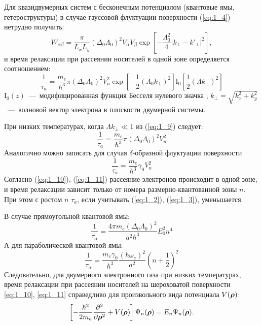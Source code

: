Для квазидвумерных систем с бесконечным потенциалом (квантовые ямы, гетероструктуры) в случае гауссовой флуктуации поверхности (\ref{eq:1_4}) нетрудно получить:
\begin{equation} \label{eq:1_9_0}
W_{\alpha\beta} =\frac{\pi }{L_x L_y} (\Delta_0 \Lambda_0 )^2 V_{\alpha} V_{\beta } \exp \left[-\frac{\Lambda_0^2 }{4} \left|k_{\bot } -k'_{\bot } \right|^2 \right],
\end{equation}
и время релаксации при рассеянии носителей в одной зоне определяется соотношением:
\begin{equation} \label{eq:1_9}
\frac{1}{\tau_a}=\frac{m_e}{\hbar^3}\pi{(\Delta_0 \Lambda_0)}^2 V_n^2 \exp{\left[-\frac{1}{2}(\Lambda_0 k_\bot )^2\right]} \mathrm{I}_0 \left[\frac{1}{2}(\Lambda k_\bot)^2\right]
\end{equation}
$\mathrm{I}_0(z)$~---~модифицированная функция Бесселя нулевого значка \cite{Abramowitz1979}, $k_\bot = \sqrt{k^2_x+k^2_y}$~---~волновой вектор электрона в плоскости двумерной системы.

При низких температурах, когда $\Lambda k_\bot \ll 1$ из (\ref{eq:1_9}) следует:
\begin{equation} \label{eq:1_10}
\frac{1}{\tau_a}=\frac{m_e }{\hbar^3}\pi (\Delta_0 \Lambda_0)^2 V_n^2
\end{equation}
Аналогично можно записать для случая $\delta$-образной флуктуации поверхности
\begin{equation} \label{eq:1_11}
\frac{1}{\tau_a}=\frac{m_e}{\hbar^3}\gamma_0 V_n^2
\end{equation}
Согласно (\ref{eq:1_10}), (\ref{eq:1_11}) рассеяние электронов происходит в одной зоне, и время релаксации зависит только от номера размерно-квантованной зоны $n$. При этом с ростом $n$ $\tau_a$, если учитывать (\ref{eq:1_2}), (\ref{eq:1_3}), уменьшается.

В случае прямоугольной квантовой ямы:
\begin{equation}
\frac{1}{\tau_\alpha} = \frac{4\pi m_e (\Delta_0 \Lambda_0)^2 }{a^2 \hbar^3} E_0^2 n^4 
\end{equation}
А для параболической квантовой ямы:
\begin{equation} \label{eq:1_14}
\frac{1}{\tau_\alpha} = \frac{m_e \gamma_0}{\hbar^3} \frac{(\hbar\omega_e)^2}{a^2}{\left(n + \frac{1}{2}\right)}^2
\end{equation}
Следовательно, для двумерного электронного газа при низких температурах, время релаксации при рассеянии носителей на шероховатой поверхности \eqref{eq:1_10}, \eqref{eq:1_11} справедливо для произвольного вида потенциала $V(\boldsymbol{\mathbf{\rho}})$:
\[
\left[-\frac{\hbar^2}{2m_e}\frac{\partial^2}{\partial \boldsymbol{\mathbf{\rho}}^2}+V(\boldsymbol{\mathbf{\rho}})\right]\Psi_n(\boldsymbol{\mathbf{\rho}})=E_n\Psi_n(\boldsymbol{\mathbf{\rho}}).
\]

